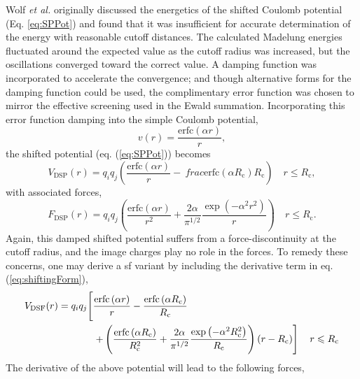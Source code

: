 \documentclass[]{book}
\begin{document}
Wolf \textit{et al.} originally discussed the energetics of the
shifted Coulomb potential (Eq. \ref{eq:SPPot}) and found that it was
insufficient for accurate determination of the energy with reasonable
cutoff distances.  The calculated Madelung energies fluctuated around
the expected value as the cutoff radius was increased, but the
oscillations converged toward the correct value.\cite{Wolf99} A
damping function was incorporated to accelerate the convergence; and
though alternative forms for the damping function could be
used,\cite{Jones56,Heyes81} the complimentary error function was
chosen to mirror the effective screening used in the Ewald summation.
Incorporating this error function damping into the simple Coulomb
potential,
\begin{equation}
v(r) = \frac{\mathrm{erfc}\left(\alpha r\right)}{r},
\label{eq:dampCoulomb}
\end{equation}
the shifted potential (eq. (\ref{eq:SPPot})) becomes
\begin{equation}
V_{\textrm{DSP}}(r) = q_iq_j\left(\frac{\textrm{erfc}\left(\alpha r\right)}{r}-\
frac{\textrm{erfc}\left(\alpha R_\textrm{c}\right)}{R_\textrm{c}}\right) \quad r
\leqslant R_\textrm{c},
\label{eq:DSPPot}
\end{equation}
with associated forces,
\begin{equation}
F_{\textrm{DSP}}(r) = q_iq_j\left(\frac{\textrm{erfc}\left(\alpha r\right)}{r^2}
+\frac{2\alpha}{\pi^{1/2}}\frac{\exp{\left(-\alpha^2r^2\right)}}{r}\right) \quad
 r\leqslant R_\textrm{c}.
\label{eq:DSPForces}
\end{equation}
Again, this damped shifted potential suffers from a
force-discontinuity at the cutoff radius, and the image charges play
no role in the forces.  To remedy these concerns, one may derive a
{\sc sf} variant by including the derivative term in
eq. (\ref{eq:shiftingForm}),
\begin{equation}
\begin{split}
V_\mathrm{DSF}(r) = q_iq_j\Biggr{[} & \frac{\mathrm{erfc}\left(\alpha r \right)}{r} -\frac{\mathrm{erfc}\left(\alpha R_\mathrm{c} \right) }{R_\mathrm{c}} \\
 & \left. +\left(\frac{\mathrm{erfc}\left(\alpha
R_\mathrm{c}\right)}{R_\mathrm{c}^2}+\frac{2\alpha}{\pi^{1/2}}\frac{\exp\left(-\alpha^2R_\mathrm{c}^2\right)}{R_\mathrm{c}}\right)\left(r-R_\mathrm{c}\right)
\right] \quad r\leqslant R_\textrm{c} 
\label{eq:DSFPot}
\end{split}
\end{equation}
The derivative of the above potential will lead to the following forces,
\end{document}
